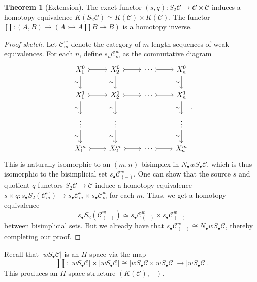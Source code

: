 \documentclass[10pt,letterpaper,cm]{nupset}
\theoremstyle{definition}
\theoremstyle{theorem}
\newtheorem{theorem}[definition]{Theorem}
\theoremstyle{remark}
\newcommand{\1}{\mathbf{1}}
\renewcommand{\c}{\mathscr{C}}
\newcommand{\0}{\vec 0}
\begin{document}
\begin{theorem}[Extension]\label{ext}
The exact functor $(s, q) : S_2{\c} \to \c \times \c$ induces  a homotopy equivalence $K(S_2{\c}) \simeq K(\c) \times K(\c)$. The functor $\coprod : \left(A, B\right) \to \left(A \rightarrowtail A \coprod B \twoheadrightarrow  B\right)$ is a homotopy inverse.
\end{theorem}
\begin{proof}[Proof sketch]
Let $\c^w_m$ denote the category of $m$-length sequences of weak equivalences. For each $n$, define $s_n\c^w_m$ as the commutative diagram
\[
\begin{tikzcd}
 X_1^0 \arrow[d, "\sim"'] \arrow[r, tail] & X_2^0 \arrow[r, tail] \arrow[d, "\sim"'] & \cdots \arrow[r, tail] & X_n^0 \arrow[d, "\sim"'] \\
X_1^1 \arrow[d, "\sim"'] \arrow[r, tail] & X_2^1 \arrow[r, tail] \arrow[d, "\sim"'] & \cdots \arrow[r, tail] & X_n^1 \arrow[d, "\sim"'] \\
  \vdots \arrow[d, "\sim"'] & \vdots \arrow[d, "\sim"'] &  & \vdots \arrow[d, "\sim"'] \\
 X_1^m \arrow[r, tail] & X_2^m \arrow[r, tail] & \cdots \arrow[r, tail] & X_n^m
\end{tikzcd}
.\]
This is naturally isomorphic to an $(m, n)$-bisimplex in $N_{\bullet}w S_{\bullet}\c$, which is thus isomorphic to the bisimplicial set $s_{\bullet}\c^w_{(-)}$. One can show that the source $s$ and quotient $q$ functors  $S_2{\c} \to \c$ induce a homotopy equivalence $s \times q : s_{\bullet}S_2(\c^w_m) \to s_{\bullet}\c^w_m \times s_{\bullet}\c^w_m$ for each $m$. Thus, we get a homotopy equivalence  $$s_{\bullet}S_2(\c^w_{(-)}) \simeq s_{\bullet}\c^w_{(-)} \times s_{\bullet}\c^w_{(-)}$$ between bisimplicial sets. But we already have that $s_{\bullet}\c^w_{(-)} \cong N_{\bullet}w S_{\bullet}\c$, thereby completing our proof.
\end{proof}

\bigskip

Recall that $\lvert{wS_{\bullet} \c}\rvert$ is an $H$-space via the map 
\[ \label{eqn:HS} \coprod: \lvert{wS_{\bullet} \c}\rvert \times \lvert{wS_{\bullet} \c}\rvert \cong \lvert{wS_{\bullet} \c \times  wS_{\bullet} \c}\rvert\to \lvert{wS_{\bullet} \c}\rvert.
\tag{$\star$}\] This produces an $H$-space structure $\left(K(\c), +\right)$.
\end{document}
